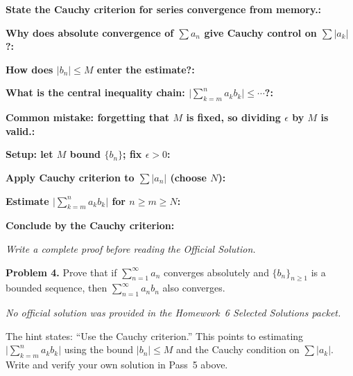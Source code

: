 \documentclass[12pt]{article}
\newcommand{\fillfield}[1]{%
  \par\noindent\textbf{#1:}\enspace\hrulefill\par\vspace{3pt}%
}
\newcommand{\writespace}[1]{\vspace{#1}}
\begin{document}
\bigskip

\begin{tcolorbox}[
  enhanced, breakable,
  colback  = pass3orange,
  colframe = orange!65!black,
  fonttitle = \bfseries,
  title = {Pass 3 \enspace\textbf{--}\enspace Self-Explanation}
]
\fillfield{State the Cauchy criterion for series convergence from memory.}
\fillfield{Why does absolute convergence of $\sum a_n$ give Cauchy control on $\sum |a_k|$?}
\fillfield{How does $|b_n| \leq M$ enter the estimate?}
\fillfield{What is the central inequality chain: $\bigl|\sum_{k=m}^n a_k b_k\bigr| \leq \cdots$?}
\fillfield{Common mistake: forgetting that $M$ is fixed, so dividing $\epsilon$ by $M$ is valid.}
\end{tcolorbox}

\newpage

\begin{tcolorbox}[
  enhanced, breakable,
  colback  = pass4purple,
  colframe = purple!55!black,
  fonttitle = \bfseries,
  title = {Pass 4 \enspace\textbf{--}\enspace Skeleton Proof}
]
\noindent\textbf{Setup: let $M$ bound $\{b_n\}$; fix $\epsilon > 0$:}\par
\writespace{1.2cm}

\noindent\textbf{Apply Cauchy criterion to $\sum |a_n|$ (choose $N$):}\par
\writespace{1.8cm}

\noindent\textbf{Estimate $\bigl|\sum_{k=m}^{n} a_k b_k\bigr|$ for $n \geq m \geq N$:}\par
\writespace{2.2cm}

\noindent\textbf{Conclude by the Cauchy criterion:}\par
\writespace{1.0cm}
\end{tcolorbox}

\newpage

\begin{tcolorbox}[
  enhanced, breakable,
  colback  = pass5gray,
  colframe = black!38,
  fonttitle = \bfseries,
  title = {Pass 5 \enspace\textbf{--}\enspace Full Proof Attempt}
]
\small\itshape Write a complete proof before reading the Official Solution.\par
\normalfont\normalsize
\writespace{19cm}
\end{tcolorbox}

\newpage

\begin{tcolorbox}[
  enhanced, breakable,
  colback  = solgreen,
  colframe = green!45!black,
  fonttitle = \bfseries,
  title = {\textsc{Official Solution}\hfill Homework 6 -- Selected Solutions}
]
\textbf{Problem 4.}
Prove that if $\sum_{n=1}^{\infty} a_n$ converges absolutely and $\{b_n\}_{n \geq 1}$
is a bounded sequence, then $\sum_{n=1}^{\infty} a_n b_n$ also converges.

\medskip
\textit{No official solution was provided in the Homework~6 Selected Solutions packet.}

\medskip
The hint states: ``Use the Cauchy criterion.''
This points to estimating $\bigl|\sum_{k=m}^{n} a_k b_k\bigr|$ using the bound
$|b_n| \leq M$ and the Cauchy condition on $\sum |a_k|$.
Write and verify your own solution in Pass~5 above.
\end{tcolorbox}
\end{document}

